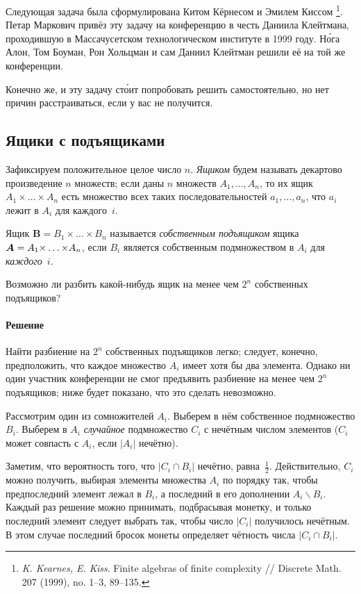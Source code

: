 \documentclass[twoside]{book}
\makeatletter
\newcommand{\rindex}[2][\imki@jobname]{%
  \index[#1]{\detokenize{#2}}%
}
\makeatother
\begin{document}
\medskip

Следующая задача была сформулирована
Китом Кёрнесом %
и Эмилем Киссом%
\footnote{\emph{K. Kearnes, E. Kiss}. Finite algebras of finite complexity /\!/ {Discrete Math.} 207 (1999), no. 1--3, 89--135.}.
Петар Маркович привёз эту задачу на конференцию в честь Даниила Клейтмана, проходившую в Массачусетском технологическом институте в 1999 году.
Н\'{о}га Алон, Том Боуман, Рон Хольцман и сам Даниил Клейтман решили её на той же конференции.

Конечно же, и эту задачу ст\'{о}ит попробовать решить самостоятельно, но нет причин расстраиваться, если у вас не получится.

\subsection*{Ящики с подъящиками}
\rindex{Ящики с подъящиками}

Зафиксируем положительное целое число $n$.
\emph{Ящиком} будем называть декартово произведение $n$ множеств;
если даны $n$ множеств $A_1,\dots,A_n$, то их ящик $A_1{\times}\dots{\times}A_n$ есть множество всех таких последовательностей $a_1,\dots,a_n$, что $a_i$ лежит в $A_i$ для каждого~$i$.

Ящик $\bm{B}=B_1{\times}\dots{\times}B_n$ называется \emph{собственным подъящиком} ящика $\bm{A}\z=A_1{\times}\z\dots{\times}A_n$, если $B_i$ является собственным подмножеством в $A_i$ для \emph{каждого}~$i$.

Возможно ли разбить какой-нибудь ящик на менее чем $2^n$ собственных подъящиков?

\paragraph{Решение}
Найти разбиение на $2^n$ собственных подъящиков легко; следует, конечно, предположить, что каждое множество $A_i$ имеет хотя бы два элемента.
Однако ни один участник конференции не смог предъявить разбиение на менее чем $2^n$ подъящиков; ниже будет показано, что это сделать невозможно.

Рассмотрим один из сомножителей $A_i$. 
Выберем в нём собственное подмножество $B_i$.
Выберем в $A_i$ \emph{случайное} подмножество $C_i$ с нечётным числом элементов ($C_i$ может совпасть с $A_i$, если $|A_i|$ нечётно).

Заметим, что вероятность того, что $|C_i\cap B_i|$ нечётно, равна~$\tfrac12$.
Действительно, $C_i$ можно получить, выбирая элементы множества $A_i$ по порядку так, чтобы предпоследний элемент лежал в $B_i$, а последний в его дополнении $A_i\backslash B_i$.
Каждый раз решение можно принимать, подбрасывая монетку, и только последний элемент следует выбрать так, чтобы число $|C_i|$ получилось нечётным.
В этом случае последний бросок монеты определяет чётность числа $|C_i\cap B_i|$.
\end{document}
